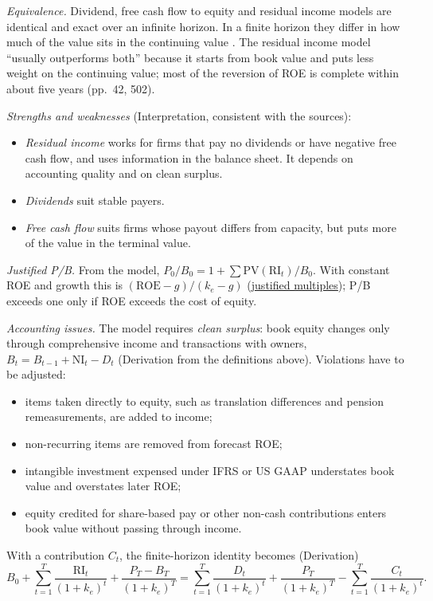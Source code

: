 \begin{qfmethod}\label{meth:residual-income-comparison}
 \emph{Equivalence.} Dividend, free cash flow to equity and residual income models are identical and exact over an infinite horizon. In a finite horizon they differ in how much of the value sits in the continuing value \citep[p.~42]{financial-statement-analysis-2009}. The residual income model ``usually outperforms both'' because it starts from book value and puts less weight on the continuing value; most of the reversion of ROE is complete within about five years (pp.~42, 502).

\emph{Strengths and weaknesses} (Interpretation, consistent with the sources):
\begin{itemize}
\item \emph{Residual income} works for firms that pay no dividends or have negative free cash flow, and uses information in the balance sheet. It depends on accounting quality and on clean surplus.
\item \emph{Dividends} suit stable payers.
\item \emph{Free cash flow} suits firms whose payout differs from capacity, but puts more of the value in the terminal value.
\end{itemize}

\emph{Justified P/B.} From the model, $P_0/B_0=1+\sum\mathrm{PV}(\mathrm{RI}_t)/B_0$. With constant ROE and growth this is $(\mathrm{ROE}-g)/(k_e-g)$ (\hyperref[meth:justified-multiples]{justified multiples}); P/B exceeds one only if ROE exceeds the cost of equity.

\emph{Accounting issues.} The model requires \emph{clean surplus}: book equity changes only through comprehensive income and transactions with owners, $B_t=B_{t-1}+\mathrm{NI}_t-D_t$ (Derivation from the definitions above). Violations have to be adjusted:
\begin{itemize}
\item items taken directly to equity, such as translation differences and pension remeasurements, are added to income;
\item non-recurring items are removed from forecast ROE;
\item intangible investment expensed under IFRS or US GAAP understates book value and overstates later ROE;
\item equity credited for share-based pay or other non-cash contributions enters book value without passing through income.
\end{itemize}
With a contribution $C_t$, the finite-horizon identity becomes (Derivation)
\[ B_0+\sum_{t=1}^{T}\frac{\mathrm{RI}_t}{(1+k_e)^t}+\frac{P_T-B_T}{(1+k_e)^T}=\sum_{t=1}^{T}\frac{D_t}{(1+k_e)^t}+\frac{P_T}{(1+k_e)^T}-\sum_{t=1}^{T}\frac{C_t}{(1+k_e)^t}. \]


\end{qfmethod}
